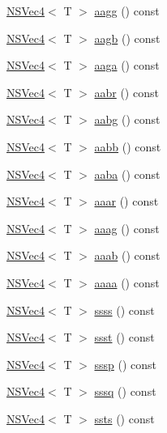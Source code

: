 \begin{DoxyCompactItemize}
\item 
\hyperlink{structNSVec4}{N\-S\-Vec4}$<$ T $>$ \hyperlink{structNSVec4_a649a0dbdc133c0d6b09c5a02ded234f8}{aagg} () const 
\item 
\hyperlink{structNSVec4}{N\-S\-Vec4}$<$ T $>$ \hyperlink{structNSVec4_a77f8e8a6827d28bddb6a1aeb9af2ec4d}{aagb} () const 
\item 
\hyperlink{structNSVec4}{N\-S\-Vec4}$<$ T $>$ \hyperlink{structNSVec4_abbc54cc494ad5c9af8aa7c11a224652a}{aaga} () const 
\item 
\hyperlink{structNSVec4}{N\-S\-Vec4}$<$ T $>$ \hyperlink{structNSVec4_ad879918a42254a6bfcf158eaa41e81b0}{aabr} () const 
\item 
\hyperlink{structNSVec4}{N\-S\-Vec4}$<$ T $>$ \hyperlink{structNSVec4_a741d0a9c0fc2b3d31786166229692862}{aabg} () const 
\item 
\hyperlink{structNSVec4}{N\-S\-Vec4}$<$ T $>$ \hyperlink{structNSVec4_a86aa306d1564550a427dbe0f072a15d3}{aabb} () const 
\item 
\hyperlink{structNSVec4}{N\-S\-Vec4}$<$ T $>$ \hyperlink{structNSVec4_a8fecfd182fa2d48af6595c307bbe5696}{aaba} () const 
\item 
\hyperlink{structNSVec4}{N\-S\-Vec4}$<$ T $>$ \hyperlink{structNSVec4_ade9d6c541aac1e10db27e31d3b0a2821}{aaar} () const 
\item 
\hyperlink{structNSVec4}{N\-S\-Vec4}$<$ T $>$ \hyperlink{structNSVec4_af2b263279e2305797f176a39db206338}{aaag} () const 
\item 
\hyperlink{structNSVec4}{N\-S\-Vec4}$<$ T $>$ \hyperlink{structNSVec4_a3e6589a743d872b7506caabece2d9ac7}{aaab} () const 
\item 
\hyperlink{structNSVec4}{N\-S\-Vec4}$<$ T $>$ \hyperlink{structNSVec4_ac494552288c5fcb6b4164522832aeb3b}{aaaa} () const 
\item 
\hyperlink{structNSVec4}{N\-S\-Vec4}$<$ T $>$ \hyperlink{structNSVec4_aec109cff538497025d8d436beea034b1}{ssss} () const 
\item 
\hyperlink{structNSVec4}{N\-S\-Vec4}$<$ T $>$ \hyperlink{structNSVec4_a92921e56f6c4fb64b8da81991c235385}{ssst} () const 
\item 
\hyperlink{structNSVec4}{N\-S\-Vec4}$<$ T $>$ \hyperlink{structNSVec4_a825b1442f76c20bc89e63db24bd6c1a3}{sssp} () const 
\item 
\hyperlink{structNSVec4}{N\-S\-Vec4}$<$ T $>$ \hyperlink{structNSVec4_a54aa6167ba60aa6742f0bdced2ec93da}{sssq} () const 
\item 
\hyperlink{structNSVec4}{N\-S\-Vec4}$<$ T $>$ \hyperlink{structNSVec4_ac49e60bab0ce70bfe6294f0ac652015b}{ssts} () const 

\end{DoxyCompactItemize}
